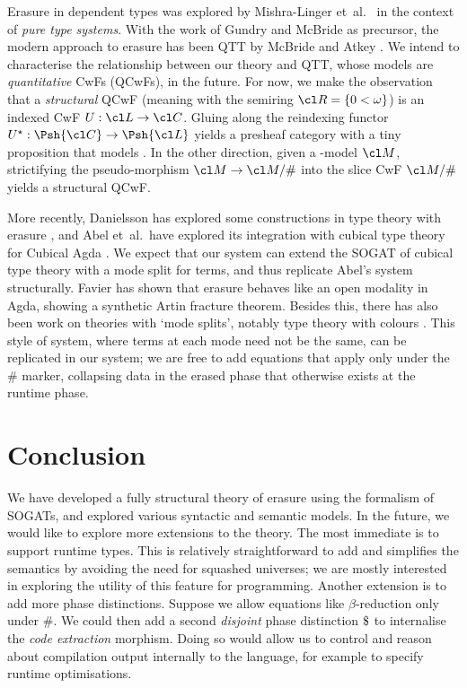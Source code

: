 Erasure in dependent types was explored by Mishra-Linger
et~al.~\cite{Mishra-Linger2008-zy} in the context of \emph{pure type systems}.
With the work of Gundry and McBride \cite{Gundry2013-px} as precursor, the
modern approach to erasure has been QTT by McBride \cite{McBride2016-oa} and
Atkey \cite{Atkey2018-pj}. We intend to characterise the relationship between
our theory and QTT, whose models are \emph{quantitative} CwFs (QCwFs), in the
future. For now, we make the observation that a \emph{structural} QCwF (meaning
with the semiring $\cl R = \{0 < \omega\}$) is an indexed CwF $U : \cl L \to \cl
C$. Gluing along the reindexing functor $U^\star : \Psh{\cl C} \to \Psh{\cl
L}$ yields a presheaf category with a tiny proposition that models \ZTT. In the
other direction, given a \ZTT-model $\cl M$, strictifying the pseudo-morphism
$\cl M \to \cl M / \#$ into the slice CwF $\cl M / \#$ yields a
structural QCwF.

More recently, Danielsson has explored some constructions in type theory with
erasure \cite{Danielsson_undated-pj}, and Abel et~al.~have explored its
integration with cubical type theory for Cubical Agda \cite{AbelUnknown-od}. We
expect that our system can extend the SOGAT of cubical type theory
\cite[4.6.3]{Uemura2021-jq} with a mode split for terms, and thus replicate
Abel's system structurally. Favier \cite{FavierUnknown-wx} has shown that
erasure behaves like an open modality in Agda, showing a synthetic Artin
fracture theorem. Besides this, there has also been work on theories with `mode
splits', notably type theory with colours \cite{Jean-Philippe2013-js}. This
style of system, where terms at each mode need not be the same, can be
replicated in our system; we are free to add equations that apply only under the
$\#$ marker, collapsing data in the erased phase that otherwise exists at the
runtime phase. 

\section{Conclusion}\label{sec:concl}

We have developed a fully structural theory of erasure using the formalism of
SOGATs, and explored various syntactic and semantic models.  
In the future, we would like to explore more extensions to the theory. The most
immediate is to support runtime types. This is relatively straightforward to add
and simplifies the semantics by avoiding the need for squashed universes; we are
mostly interested in exploring the utility of this feature for programming.
Another extension is to add more phase distinctions. Suppose we allow equations
like $\beta$-reduction only under $\#$. We could then add a second
\emph{disjoint} phase distinction $\text{\textdollar}$ to internalise the \emph{code
extraction} morphism. Doing so would allow us to control and reason about
compilation output internally to the language, for example to specify runtime
optimisations.

